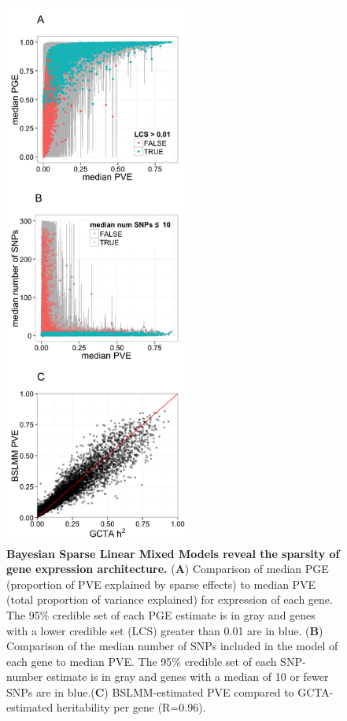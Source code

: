 \documentclass[10pt,letterpaper]{article}
\begin{document}
\begin{figure}[h]
\includegraphics[width=6cm]{Figures/Fig-DGN-BSLMM.png}
\caption{{\bf Bayesian Sparse Linear Mixed Models reveal the sparsity of gene expression architecture.} 
(\textbf{A}) Comparison of median PGE
(proportion of PVE explained by sparse effects) to median PVE (total
proportion of variance explained) for expression of each gene. The 95\%
credible set of each PGE estimate is in gray and genes with a lower
credible set (LCS) greater than 0.01 are in blue. (\textbf{B})
Comparison of the median number of SNPs included in the model of each
gene to median PVE. The 95\% credible set of each SNP-number estimate is
in gray and genes with a median of 10 or fewer SNPs are in blue.(\textbf{C}) 
BSLMM-estimated PVE compared to GCTA-estimated
heritability per gene (R=0.96).}
\label{fig-dgn-bslmm}
\end{figure}
\end{document}
